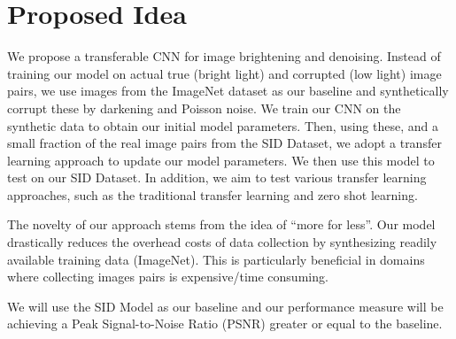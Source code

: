 \documentclass{article}
\begin{document}
\section{Proposed Idea}

We propose a transferable CNN for image brightening and denoising. Instead
of training our model on actual true (bright light) and corrupted
(low light) image pairs, we use images from the ImageNet dataset as our
baseline and synthetically corrupt these by darkening and Poisson noise. We
train our CNN on the synthetic data to obtain our initial model parameters.
Then, using these, and a small fraction of the real image pairs from the SID
Dataset, we adopt a transfer learning approach to update our model
parameters. We then use this model to test on our SID Dataset. In addition,
we aim to test various transfer learning approaches, such as the
traditional transfer learning and zero shot learning. 


The novelty of our approach stems from the idea of “more for less”. Our
model drastically reduces the overhead costs of data collection by
synthesizing readily available training data (ImageNet). This is
particularly beneficial in domains where collecting images pairs is
expensive/time consuming. 


We will use the SID Model as our baseline and our performance measure will be achieving a Peak Signal-to-Noise Ratio (PSNR) greater or equal to the baseline.




\end{document}
